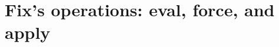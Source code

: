 \documentclass{article}
\newcommand{\valuex}{\textrm{Value}\xspace}
\newcommand{\valuexs}{\textrm{Value}s\xspace}
\newcommand{\object}{\textrm{Object}\xspace}
\newcommand{\encode}{\textrm{Encode}\xspace}
\newcommand{\thunk}{\textrm{Thunk}\xspace}
\newcommand{\thunks}{\textrm{Thunk}s\xspace}
\newcommand{\name}{\textrm{Name}\xspace}
\newcommand{\tree}{\textrm{Tree}\xspace}
\newcommand{\bs}{\vspace{\baselineskip}}
\newcommand{\eval}{\textsf{eval}}
\newcommand{\apply}{\textsf{apply}}
\newcommand{\force}{\textsf{force}}
\begin{document}

\section{Fix's operations: \eval{}, \force{}, and \apply{}}
\end{document}
